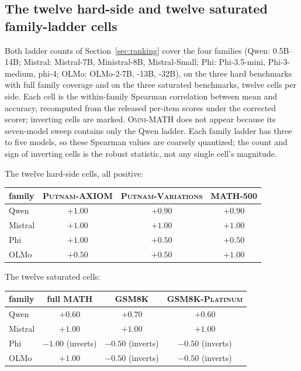 \subsection{The twelve hard-side and twelve saturated family-ladder cells}
\label{app:ladders}
Both ladder counts of Section~\ref{sec:ranking} cover the four families (Qwen: 0.5B--14B; Mistral: Mistral-7B, Ministral-8B, Mistral-Small; Phi: Phi-3.5-mini, Phi-3-medium, phi-4; OLMo: OLMo-2-7B, -13B, -32B), on the three hard benchmarks with full family coverage and on the three saturated benchmarks, twelve cells per side.
Each cell is the within-family Spearman correlation between mean \tfa{} and accuracy, recomputed from the released per-item scores under the corrected scorer; inverting cells are marked.
\textsc{Omni-MATH} does not appear because its seven-model sweep contains only the Qwen ladder.
Each family ladder has three to five models, so these Spearman values are coarsely quantized; the count and sign of inverting cells is the robust statistic, not any single cell's magnitude.

The twelve hard-side cells, all positive:

\begin{center}
\small
\begin{tabular}{lccc}
\toprule
family & \textsc{Putnam-AXIOM} & \textsc{Putnam-Variations} & \textsc{MATH-500} \\
\midrule
Qwen & $+1.00$ & $+0.90$ & $+0.90$ \\
Mistral & $+1.00$ & $+1.00$ & $+1.00$ \\
Phi & $+1.00$ & $+0.50$ & $+0.50$ \\
OLMo & $+0.50$ & $+0.50$ & $+1.00$ \\
\bottomrule
\end{tabular}
\end{center}

The twelve saturated cells:

\begin{center}
\small
\begin{tabular}{lccc}
\toprule
family & full \textsc{MATH} & \textsc{GSM8K} & \textsc{GSM8K-Platinum} \\
\midrule
Qwen & $+0.60$ & $+0.70$ & $+0.60$ \\
Mistral & $+1.00$ & $+1.00$ & $+1.00$ \\
Phi & $-1.00$ (inverts) & $-0.50$ (inverts) & $-0.50$ (inverts) \\
OLMo & $+1.00$ & $-0.50$ (inverts) & $-0.50$ (inverts) \\
\bottomrule
\end{tabular}
\end{center}

